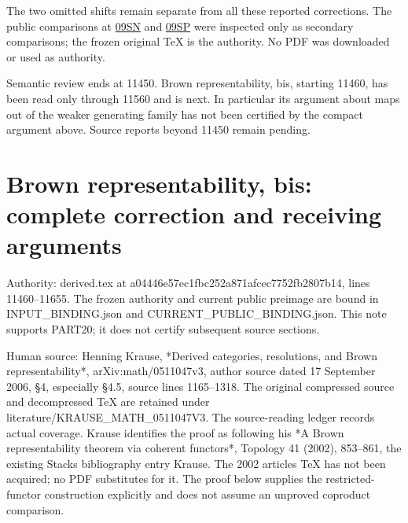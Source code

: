\documentclass[11pt]{article}
\begin{document}
The two omitted shifts remain separate from all these reported corrections. The public comparisons at \href{https://stacks.math.columbia.edu/tag/09SN}{09SN} and \href{https://stacks.math.columbia.edu/tag/09SP}{09SP} were inspected only as secondary comparisons; the frozen original TeX is the authority. No PDF was downloaded or used as authority.

Semantic review ends at 11450. Brown representability,\allowbreak{} bis,\allowbreak{} starting 11460,\allowbreak{} has been read only through 11560 and is next. In particular its argument about maps out of the weaker generating family has not been certified by the compact argument above. Source reports beyond 11450 remain pending.
\clearpage
\section{\texorpdfstring{Brown representability,\allowbreak{} bis:\allowbreak{} complete correction and receiving arguments}{Brown   complete correction and receiving arguments}}\label{proofs-11460-11655-brown-representability-bis-complete-correction-and-receiving-arguments}

Authority:\allowbreak{} derived.tex at a04446e5\allowbreak{}7ec1fbc2\allowbreak{}52a871af\allowbreak{}cec7752f\allowbreak{}b2807b14, lines 11460–\allowbreak{}11655. The frozen authority and current public preimage are bound in INPUT\_\allowbreak{}BINDING.json and CURRENT\_\allowbreak{}PUBLIC\_\allowbreak{}BINDING.json. This note supports PART20; it does not certify subsequent source sections.

Human source:\allowbreak{} Henning Krause,\allowbreak{} *Derived categories,\allowbreak{} resolutions,\allowbreak{} and Brown representability*,\allowbreak{} arXiv:\allowbreak{}math/\allowbreak{}0511047v3,\allowbreak{} author source dated 17 September 2006,\allowbreak{} §4,\allowbreak{} especially §4.5,\allowbreak{} source lines 1165–\allowbreak{}1318. The original compressed source and decompressed TeX are retained under literature/\allowbreak{}KRAUSE\_\allowbreak{}MATH\_\allowbreak{}0511047V3. The source-reading ledger records actual coverage. Krause identifies the proof as following his *A Brown representability theorem via coherent functors*,\allowbreak{} Topology 41 (2002)\allowbreak{},\allowbreak{} 853–\allowbreak{}861,\allowbreak{} the existing Stacks bibliography entry Krause. The 2002 article\textquotesingle s TeX has not been acquired; no PDF substitutes for it. The proof below supplies the restricted-functor construction explicitly and does not assume an unproved coproduct comparison.
\end{document}

